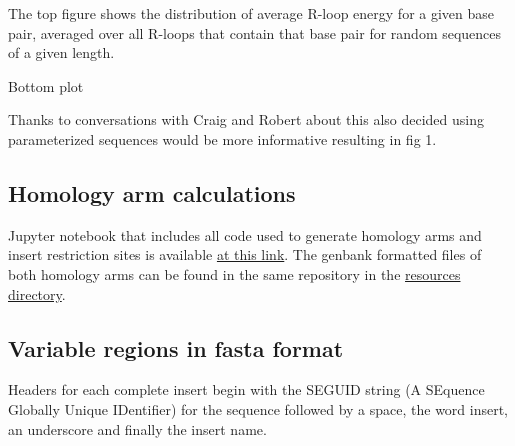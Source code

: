 \documentclass[11pt]{article}
\begin{document}
The top figure shows the distribution of average R-loop energy for a given base pair, averaged over all R-loops that contain that base pair for random sequences of a given length.

Bottom plot

Thanks to conversations with Craig and Robert about this also decided using parameterized sequences would be more informative resulting in fig 1.


\subsection{Homology arm calculations}

Jupyter notebook that includes all code used to generate homology arms and insert
restriction sites is available  \href{https://github.com/EthanHolleman/plasmid-VR-design/blob/main/notes/homology_arms.ipynb}{at this link}. The genbank formatted files of both homology arms can be found in the same repository in the \href{https://github.com/EthanHolleman/plasmid-VR-design/tree/main/resources/files/genbank}{resources directory}.

\subsection{Variable regions in fasta format}
\label{sec:fasta-inserts}

Headers for each complete insert begin with the SEGUID string (A SEquence Globally Unique IDentifier) \cite{Babnigg2006} for the sequence followed by a space, the word insert, an underscore and finally the insert name.
\end{document}

